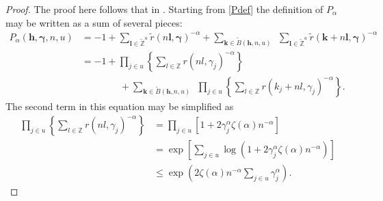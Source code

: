 \documentclass{article}
\renewcommand{\vec}[1]{\ensuremath{\mathbf{#1}}}
\newcommand{\vecsym}[1]{\ensuremath{\boldsymbol{#1}}}
\newcommand{\bfgam}{\vecsym \gamma}
\renewcommand{\k}{\vec k}
\newcommand{\h}{\vec h}
\renewcommand{\l}{\vec l}
\newcommand{\Z}{\mathbb{Z}}
\newcommand{\tZu}{\tilde{\Z}^{u}}
\begin{document}
\begin{proof} The proof here follows that in \cite[Theorem
5.5]{Nie92}.  Starting from \eqref{Pdef} the definition of
$P_{\alpha}$ may be written as a sum of several pieces:
\begin{align}
    P_{\alpha}(\h,\bfgam,n,u) & = -1 + \sum_{\l \in \tZu}
    \tilde{r}(n\l,\bfgam)^{-\alpha} + \sum_{\k \in
    \tilde{B}(\h,n,u)} \ \ \sum_{\l \in \tZu} \tilde{r}(\k+n
    \l,\bfgam)^{-\alpha} \nonumber \\
    & = -1 + \prod_{j \in u} \left\{ \sum_{l \in
    \Z} r(nl,\gamma_{j})^{-\alpha}  \right\} \nonumber \\
    & \qquad \qquad + \sum_{\k \in \tilde{B}(\h,n,u)} \ \
    \prod_{j \in u} \left\{ \sum_{l \in \Z}
    r(k_{j}+nl,\gamma_{j})^{-\alpha} \right\}. \label{Paderiv}
\end{align}
The second term in this equation may be simplified as
\begin{align*}
    \prod_{j \in u} \left\{ \sum_{l \in \Z}
    r(nl,\gamma_{j})^{-\alpha} \right\} &= \prod_{j \in u} [1 +
    2 \gamma_{j}^{\alpha} \zeta(\alpha) n^{-\alpha} ] \\
    &=\exp\left[ \sum_{j \in u} \log(1 + 2 \gamma_{j}^{\alpha} \zeta(\alpha)
    n^{-\alpha} ) \right ]\\
    & \le \exp\left( 2 \zeta(\alpha)n^{-\alpha}
    \sum_{j \in u} \gamma^{\alpha}_{j} \right).
\end{align*}


\end{proof}
\end{document}
